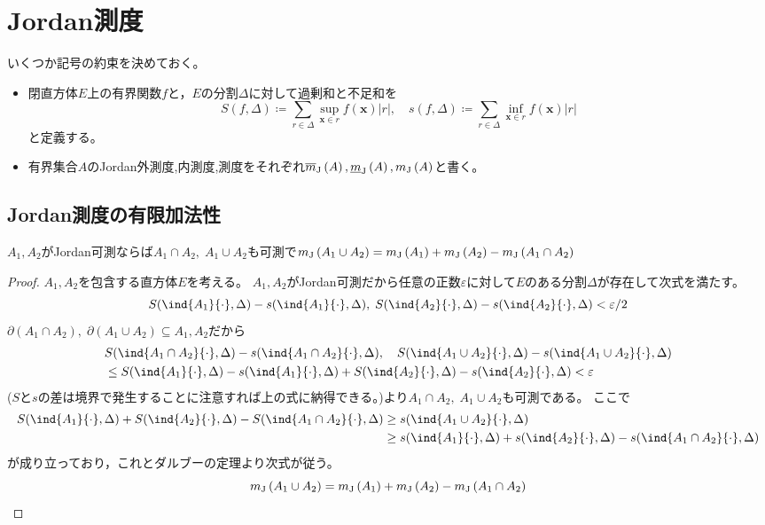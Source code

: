     \section{Jordan測度}
        いくつか記号の約束を決めておく。
        \begin{itemize}
            \item 閉直方体$E$上の有界関数$f$と，$E$の分割$\Delta$に対して過剰和と不足和を
            \[ S(f,\Delta) \coloneq \sum_{r\in\Delta} \sup_{\bm{x}\in r}f(\bm{x})|r|,\quad s(f,\Delta) \coloneq \sum_{r\in\Delta} \inf_{\bm{x}\in r}f(\bm{x})|r| \]
            と定義する。
            \item 有界集合$A$のJordan外測度,内測度,測度をそれぞれ$\protect\overline{m}_\textrm{J}\left(A\right), \protect\underline{m}_\textrm{J}\left(A\right), m_\textrm{J}\left(A\right)$と書く。
        \end{itemize}
        \subsection{Jordan測度の有限加法性}
            \begin{shadebox}
                $A_1,A_2$がJordan可測ならば$A_1\cap A_2,\;A_1\cup A_2$も可測で$m_\textrm{J}\left(A_1\cup A_2\right) = m_\textrm{J}\left(A_1\right) + m_\textrm{J}\left(A_2\right) - m_\textrm{J}\left(A_1\cap A_2\right)$
            \end{shadebox}
            \begin{proof}
                \quad\par
                $A_1,A_2$を包含する直方体$E$を考える。
                $A_1,A_2$がJordan可測だから任意の正数$\varepsilon$に対して$E$のある分割$\Delta$が存在して次式を満たす。
                \[ S(\ind{A_1}{\cdot},\Delta) - s(\ind{A_1}{\cdot},\Delta),\; S(\ind{A_2}{\cdot},\Delta) - s(\ind{A_2}{\cdot},\Delta) < \varepsilon/2 \]
                $\partial(A_1\cap A_2),\;\partial(A_1\cup A_2) \subseteq A_1, A_2$だから
                \begin{align*}
                    &S(\ind{A_1\cap A_2}{\cdot},\Delta) - s(\ind{A_1\cap A_2}{\cdot},\Delta),\quad S(\ind{A_1\cup A_2}{\cdot},\Delta) - s(\ind{A_1\cup A_2}{\cdot},\Delta) \\
                    &\leq S(\ind{A_1}{\cdot},\Delta) - s(\ind{A_1}{\cdot},\Delta) + S(\ind{A_2}{\cdot},\Delta) - s(\ind{A_2}{\cdot},\Delta) < \varepsilon
                \end{align*}
                ($S$と$s$の差は境界で発生することに注意すれば上の式に納得できる。)より$A_1\cap A_2,\;A_1\cup A_2$も可測である。
                ここで
                \begin{align*}
                    S(\ind{A_1}{\cdot},\Delta) + S(\ind{A_2}{\cdot},\Delta) - S(\ind{A_1\cap A_2}{\cdot},\Delta) &\geq s(\ind{A_1\cup A_2}{\cdot},\Delta) \\
                    &\geq s(\ind{A_1}{\cdot},\Delta) + s(\ind{A_2}{\cdot},\Delta) - s(\ind{A_1\cap A_2}{\cdot},\Delta)
                \end{align*}
                が成り立っており，これとダルブーの定理より次式が従う。
                \[ m_\textrm{J}\left(A_1\cup A_2\right) = m_\textrm{J}\left(A_1\right) + m_\textrm{J}\left(A_2\right) - m_\textrm{J}\left(A_1\cap A_2\right) \]
            \end{proof}
